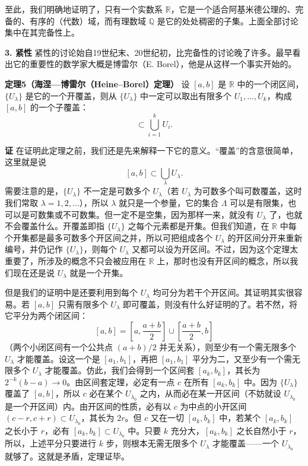 至此，我们明确地证明了，只有一个实数系 $\mathbb R$，它是一个适合阿基米德公理的、完备的、有序的（代数）域，而有理数域 $\mathbb Q$ 是它的处处稠密的子集。上面全部讨论集中在其完备性上。

\noindent\textbf{3. 紧性}\quad
紧性的讨论始自19世纪末、20世纪初，比完备性的讨论晚了许多。最早看出它的重要性的数学家大概是博雷尔（E. Borel），他是从这样一个事实开始的。

\noindent\textbf{定理5（海涅—博雷尔（Heine--Borel）定理）}\quad
设 $[a,b]$ 是 $\mathbb R$ 中的一个闭区间，$\{U_\lambda\}$ 是它的一个开覆盖，则从 $\{U_\lambda\}$ 中一定可以取出有限多个 $U_1,\ldots,U_k$，构成 $[a,b]$ 的一个子覆盖：
\begin{equation}
 [a,b]\subset\bigcup_{i=1}^k U_i.
 \tag{3}
\end{equation}

\noindent\textbf{证}\quad
在证明此定理之前，我们还是先来解释一下它的意义。“覆盖”的含意很简单，这里就是说
\[
 [a,b]\subset\bigcup_\lambda U_\lambda.
\]
需要注意的是，$\{U_\lambda\}$ 不一定是可数多个 $U_\lambda$（若 $U_\lambda$ 为可数多个叫可数覆盖，这时我们常取 $\lambda=1,2,\ldots$），所以 $\lambda$ 就只是一个参量，它的集合 $\Lambda$ 可以是有限集，也可以是可数集或不可数集。但一定不是空集，因为那样一来，就没有 $U_\lambda$ 了，也就不会覆盖什么。开覆盖即指 $\{U_\lambda\}$ 之每个元素都是开集。但我们知道，在 $\mathbb R$ 中每个开集都是最多可数多个开区间之并，所以可把组成各个 $U_\lambda$ 的开区间分开来重新编号，并仍记作 $\{U_\lambda\}$，则每个 $U_\lambda$ 又都可以设为开区间。不过，因为这个定理太重要了，所涉及的概念不只会被应用在 $\mathbb R$ 上，那时也没有开区间的概念，所以我们现在还是说 $U_\lambda$ 就是一个开集。

但是我们的证明中是还要利用到每个 $U_\lambda$ 均可分为若干个开区间。其证明其实很容易。若 $[a,b]$ 只需有限多个 $U_\lambda$ 即可覆盖，则没有什么好证明的了。若不然，将它平分为两个闭区间：
\[
 [a,b]=\left[a,\frac{a+b}{2}\right]\cup\left[\frac{a+b}{2},b\right]
\]
（两个小闭区间有一个公共点 $(a+b)/2$ 并无关系），则至少有一个需无限多个 $U_\lambda$ 才能覆盖。设这一个是 $[a_1,b_1]$，再把 $[a_1,b_1]$ 平分为二，又至少有一个需无限多个 $U_\lambda$ 才能覆盖。仿此，我们会得到一个区间套 $[a_k,b_k]$，其长为 $2^{-k}(b-a)\to0$。由区间套定理，必定有一点 $c$ 在所有 $[a_k,b_k]$ 中。因为 $\{U_\lambda\}$ 覆盖了 $[a,b]$，所以 $c$ 必在某个 $U_{\lambda_0}$ 之内，从而必在某一开区间（不妨就设 $U_{\lambda_0}$ 是一个开区间）内。由开区间的性质，必有以 $c$ 为中点的小开区间 $(c-r,c+r)\subset U_{\lambda_0}$，其长为 $2r$。但 $c$ 又在一切 $[a_k,b_k]$ 中，若某个 $[a_k,b_k]$ 之长小于 $r$，必有 $[a_k,b_k]\subset U_{\lambda_0}$ 中。只要 $k$ 充分大，$[a_k,b_k]$ 之长自然小于 $r$，所以，上述平分只要进行 $k$ 步，则根本无需无限多个 $U_\lambda$ 才能覆盖——一个 $U_{\lambda_0}$ 就够了。这就是矛盾，定理证毕。

